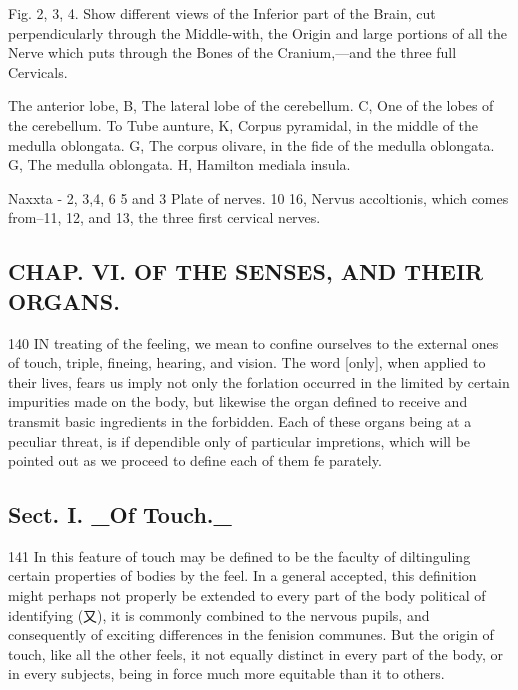 Fig. 2, 3, 4. Show different views of the Inferior part of the Brain, cut perpendicularly through the Middle-with, the Origin and large portions of all the Nerve which puts through the Bones of the Cranium,—and the three full Cervicals.\par\medskip
The anterior lobe, B, The lateral lobe of the cerebellum. C, One of the lobes of the cerebellum. To Tube aunture, K, Corpus pyramidal, in the middle of the medulla oblongata. G, The corpus olivare, in the fide of the medulla oblongata. G, The medulla oblongata. H, Hamilton mediala insula.\par\medskip
Naxxta - 2, 3,4, 6 5 and 3 Plate of nerves. 10 16, Nervus accoltionis, which comes from--11, 12, and 13, the three first cervical nerves.\par\medskip
\subsection*{CHAP. VI. OF THE SENSES, AND THEIR ORGANS.}
140 IN treating of the feeling, we mean to confine ourselves to the external ones of touch, triple, fineing, hearing, and vision. The word [only], when applied to their lives, fears us imply not only the forlation occurred in the limited by certain impurities made on the body, but likewise the organ defined to receive and transmit basic ingredients in the forbidden. Each of these organs being at a peculiar threat, is if dependible only of particular impretions, which will be pointed out as we proceed to define each of them fe parately.\par\medskip
\subsection*{Sect. I. \_Of Touch.\_}
141 In this feature of touch may be defined to be the faculty of diltinguling certain properties of bodies by the feel. In a general accepted, this definition might perhaps not properly be extended to every part of the body political of identifying (又), it is commonly combined to the nervous pupils, and consequently of exciting differences in the fenision communes. But the origin of touch, like all the other feels, it not equally distinct in every part of the body, or in every subjects, being in force much more equitable than it to others.\par\medskip
